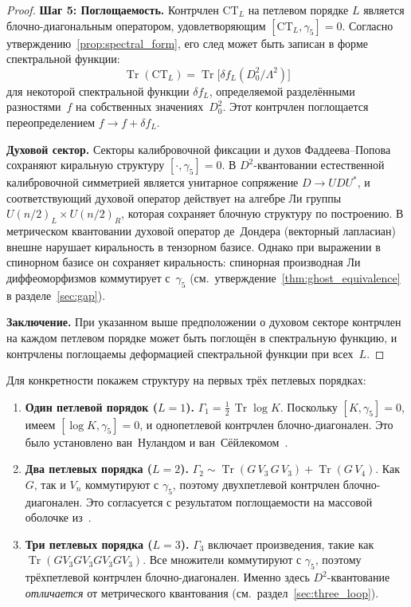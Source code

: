 \documentclass[12pt,a4paper]{article}
\theoremstyle{definition}
\theoremstyle{remark}
\newcommand{\Tr}{\operatorname{Tr}}
\newcommand{\half}{\tfrac{1}{2}}
\newcommand{\Lam}{\Lambda}
\begin{document}
\begin{proof}
\medskip\noindent\textbf{Шаг 5: Поглощаемость.}
Контрчлен $\mathrm{CT}_L$ на петлевом порядке $L$ является
блочно-диагональным оператором, удовлетворяющим
$[\mathrm{CT}_L, \gamma_5] = 0$.  Согласно
утверждению~\ref{prop:spectral_form}, его след может быть записан в
форме спектральной функции:
\begin{equation}\label{eq:absorbable}
  \Tr(\mathrm{CT}_L) = \Tr\bigl[\delta f_L(D_0^2/\Lam^2)\bigr]
\end{equation}
для некоторой спектральной функции $\delta f_L$, определяемой
разделёнными разностями~$f$ на собственных значениях~$D_0^2$.  Этот
контрчлен поглощается переопределением $f \to f + \delta f_L$.

\medskip\noindent\textbf{Духовой сектор.}
Секторы калибровочной фиксации и духов Фаддеева--Попова сохраняют
киральную структуру $[\cdot, \gamma_5] = 0$.  В $D^2$-квантовании
естественной калибровочной симметрией является унитарное сопряжение
$D \to UDU^*$, и соответствующий духовой оператор действует на алгебре
Ли группы $U(n/2)_L \times U(n/2)_R$, которая сохраняет блочную
структуру по построению.  В метрическом квантовании духовой оператор
де~Дондера (векторный лапласиан) внешне нарушает киральность в
тензорном базисе.  Однако при выражении в спинорном базисе он
сохраняет киральность: спинорная производная Ли диффеоморфизмов
коммутирует с~$\gamma_5$ (см.\
утверждение~\ref{thm:ghost_equivalence} в разделе~\ref{sec:gap}).

\medskip\noindent\textbf{Заключение.}
При указанном выше предположении о духовом секторе контрчлен на каждом
петлевом порядке может быть поглощён в спектральную функцию, и контрчлены
поглощаемы деформацией спектральной функции при всех~$L$.
\end{proof}

\medskip

Для конкретности покажем структуру на первых трёх петлевых порядках:

\begin{enumerate}
  \item \textbf{Один петлевой порядок ($L = 1$).}
  $\Gamma_1 = \half\,\Tr\log K$.  Поскольку $[K, \gamma_5] = 0$,
  имеем $[\log K, \gamma_5] = 0$, и однопетлевой контрчлен
  блочно-диагонален.  Это было установлено ван~Нуландом и
  ван~Сёйлекомом~\cite{vanNuland:2021oneloop}.

  \item \textbf{Два петлевых порядка ($L = 2$).}
  $\Gamma_2 \sim \Tr(G\,V_3\,G\,V_3) + \Tr(G\,V_4)$.
  Как $G$, так и $V_n$ коммутируют с $\gamma_5$, поэтому двухпетлевой
  контрчлен блочно-диагонален.  Это согласуется с результатом
  поглощаемости на массовой оболочке из~\cite{Alfyorov:2026ct}.

  \item \textbf{Три петлевых порядка ($L = 3$).}
  $\Gamma_3$ включает произведения, такие как
  $\Tr(G V_3 G V_3 G V_3 G V_3)$.  Все множители коммутируют с
  $\gamma_5$, поэтому трёхпетлевой контрчлен блочно-диагонален.  Именно
  здесь $D^2$-квантование \emph{отличается} от метрического квантования
  (см.\ раздел~\ref{sec:three_loop}).
\end{enumerate}
\end{document}
